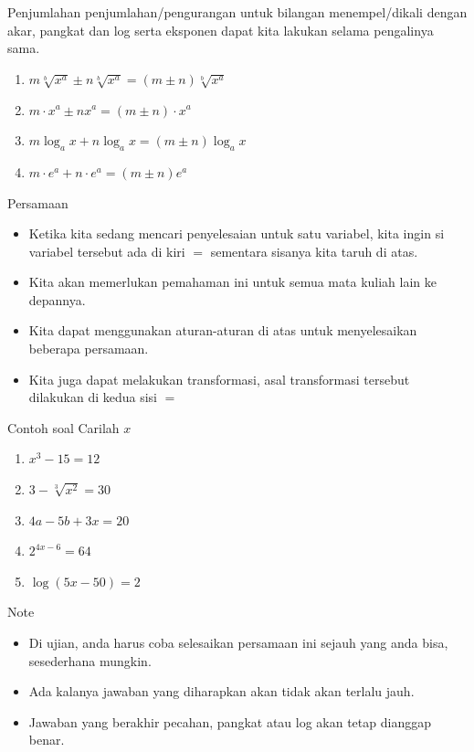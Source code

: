 \documentclass[
  ignorenonframetext,
]{beamer}
\begin{document}
\begin{frame}{Penjumlahan}
\label{penjumlahan}
penjumlahan/pengurangan untuk bilangan menempel/dikali dengan akar,
pangkat dan log serta eksponen dapat kita lakukan selama pengalinya
sama.

\begin{enumerate}
\item
  \(m \sqrt[b]{x^a} \pm n \sqrt[b]{x^a}=(m \pm n)\sqrt[b]{x^a}\)
\item
  \(m \cdot x^a \pm n x^a=(m \pm n)\cdot x^a\)
\item
  \(m \log_a x+n \log_a x=(m\pm n) \log_a x\)
\item
  \(m \cdot e^a+n \cdot e^a=(m\pm n) e^a\)
\end{enumerate}
\end{frame}

\begin{frame}{Persamaan}
\label{persamaan}
\begin{itemize}
\item
  Ketika kita sedang mencari penyelesaian untuk satu variabel, kita
  ingin si variabel tersebut ada di kiri \(=\) sementara sisanya kita
  taruh di atas.
\item
  Kita akan memerlukan pemahaman ini untuk semua mata kuliah lain ke
  depannya.
\item
  Kita dapat menggunakan aturan-aturan di atas untuk menyelesaikan
  beberapa persamaan.
\item
  Kita juga dapat melakukan transformasi, asal transformasi tersebut
  dilakukan di kedua sisi \(=\)
\end{itemize}
\end{frame}

\begin{frame}{Contoh soal}
\label{contoh-soal}
Carilah \(x\)

\begin{enumerate}
\item
  \(x^3-15=12\)
\item
  \(3-\sqrt[3]{x^2}=30\)
\item
  \(4a-5b+3x=20\)
\item
  \(2^{4x-6}=64\)
\item
  \(\log (5x-50)=2\)
\end{enumerate}
\end{frame}

\begin{frame}{Note}
\label{note}
\begin{itemize}
\item
  Di ujian, anda harus coba selesaikan persamaan ini sejauh yang anda
  bisa, sesederhana mungkin.
\item
  Ada kalanya jawaban yang diharapkan akan tidak akan terlalu jauh.
\item
  Jawaban yang berakhir pecahan, pangkat atau log akan tetap dianggap
  benar.
\end{itemize}
\end{frame}
\end{document}
